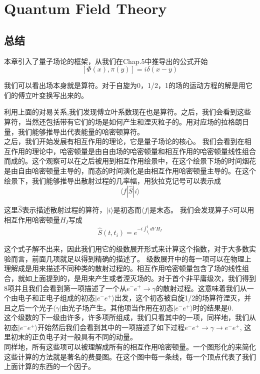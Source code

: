 

\usepackage{mathrsfs}


\chapter[量子场论]{Quantum Field Theory }
\label{chap9}

\section*{总结}
本章引入了量子场论的框架，从我们在Chap.5中推导出的公式开始
$$[\Phi(x),\pi(y)]=i\delta(x-y)$$

我们可以看出场本身就是算符。对于自旋为0，1/2，1的场的运动方程的解是用它们的傅立叶变换写出来的。

利用上面的对易关系,我们发现傅立叶系数现在也是算符。之后，我们会看到这些算符，当然还包括带有它们的场是如何产生和湮灭粒子的。用对应场的拉格朗日量，我们能够推导出代表能量的哈密顿算符。\\
之后，我们开始发展有相互作用的理论，它是量子场论的核心。 我们会看到在相互作用的理论中，哈密顿量是由自由场的哈密顿量和相互作用的哈密顿量线性组合而成的。这个观察可以在之后被用到相互作用绘景中，在这个绘景下场的时间烟花是由自由哈密顿量主导的，而态的时间演化是由相互作用哈密顿量主导的。在这个绘景下，我们能够推导出散射过程的几率幅，用狄拉克记号可以表示成
$$\langle f | \hat{S} | i\rangle$$

这里$\hat{S}$表示描述散射过程的算符，$|i\rangle$是初态而$\langle f|$是末态。 我们会发现算子$\hat{S}$可以用相互作用哈密顿量$H_{I}$写成
$$\hat{S}(t,t_{i})=e^{-i\int_{t_{i}}^{t} dt' H_{I}}$$

这个式子解不出来，因此我们用它的级数展开形式来计算这个指数，对于大多数实验而言，前面几项就足以得到精确的描述了。
级数展开中的每一项可以在物理上理解成是用来描述不同种类的散射过程的。相互作用哈密顿量包含了场的线性组合，就如上面提到的，是用来产生或者湮灭场的。对于首个非平庸级次，我们得到8项并且我们会看到第一项描述了一个从$e^{-} e^{+} \to \gamma$的散射过程。这意味着我们从一个由电子和正电子组成的初态$|e^{-}e^{+} \rangle$出发，这个初态被自旋1/2的场算符湮灭，并且之后一个光子$\langle \gamma |$由光子场产生。其他项当作用在初态$|e^{-}e^{+} \rangle$时的结果是0.\\
这个级数的下一级由许多，许多项所组成，我们只看其中的一项，同样地，我们从初态$|e^{-}e^{+} \rangle$开始然后我们会看到其中的一项描述了如下过程$e^{-}e^{+} \to \gamma \to e^{-}e^{+}$, 这里初末的正负电子对一般具有不同的动量。\\
同样地，所有这些项可以被理解成所有的相互作用哈密顿量。一个图形化的来简化这些计算的方法就是著名的费曼图。在这个图中每一条线，每一个顶点代表了我们上面计算的东西的一个因子。
